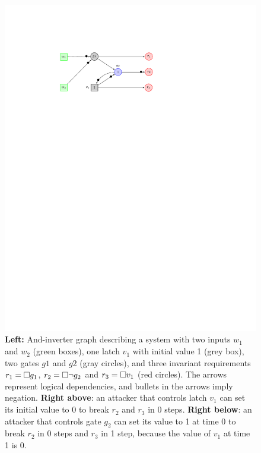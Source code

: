 {\begin{figure}[!t]
\begin{minipage}{0.35\textwidth}
\begin{framed}
\includegraphics[width=\textwidth]{Attack1.pdf}
\end{framed}
\end{minipage}
\caption{\textbf{Left:} And-inverter graph describing a system with two
inputs $w_1$ and $w_2$ (green boxes), one latch $v_1$ with initial value 1 (grey box), two gates $g1$ and $g2$ (gray circles), and three invariant requirements $r_1={{\square}} g_1$, $r_2={{\square}} \lnot g_2$ and $r_3={{\square}} v_1$ (red circles). 
The arrows represent logical dependencies, and bullets in the arrows imply negation.
\textbf{Right above}: an attacker that controls latch $v_1$ can set its initial value to 0 to break $r_2$ and $r_3$ in 0 steps. 
\textbf{Right below}: an attacker that controls gate $g_2$ can set its value to 1 at time 0 to break $r_2$ in 0 steps and $r_3$ in 1 step, because the value of $v_1$ at time 1 is 0. }%
\label{fig:Example}
\end{figure}
%


}
